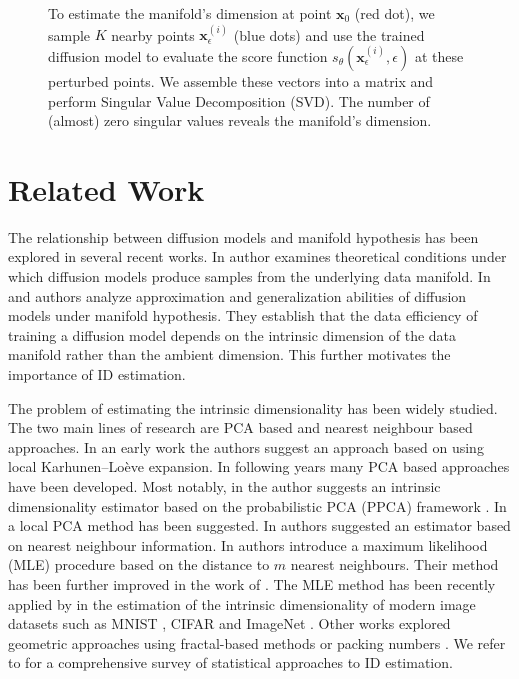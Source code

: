 \begin{figure}[h]
\begin{minipage}[t]{0.49\linewidth}
        \caption{To estimate the manifold's dimension at point \(\mathbf{x}_0\) (red dot), we sample \(K\) nearby points \(\mathbf{x}_{\epsilon}^{(i)}\) (blue dots) and use the trained diffusion model to evaluate the score function \(s_\theta(\mathbf{x}_\epsilon^{(i)}, \epsilon)\) at these perturbed points. We assemble these vectors into a matrix and perform Singular Value Decomposition (SVD). The number of (almost) zero singular values reveals the manifold's dimension.}
        \label{ch3:fig:zoom}
    \end{minipage}
\end{figure}


\section{Related Work}
\label{ch3:sec:related_work}
The relationship between diffusion models and manifold hypothesis has been explored in several recent works. In \cite{pidstrigach2022manifold_jakiw} author examines theoretical conditions under which diffusion models produce samples from the underlying data manifold. In \cite{oko2023diffusion_mini_max} and \cite{chen2023manifold_linear} authors analyze approximation and generalization abilities of diffusion models under manifold hypothesis. They establish that the data efficiency of training a diffusion model depends on the intrinsic dimension of the data manifold rather than the ambient dimension. This further motivates the importance of ID estimation.


The problem of estimating the intrinsic dimensionality has been widely studied. The two main lines of research are PCA based and nearest neighbour based approaches. In an early work \cite{Karhunen-Loeve} the authors suggest an approach based on using local Karhunen–Loève expansion. In following years many PCA based approaches have been developed. Most notably, in \cite{auto_ppca} the author suggests an intrinsic dimensionality estimator based on the probabilistic PCA (PPCA) framework \cite{ppca}. In \cite{fan_local_pca} a local PCA method has been suggested. In \cite{pettis_nn_dim_estimator} authors suggested an estimator based on nearest neighbour information.  In \cite{dim_MLE} authors introduce a maximum likelihood (MLE)  procedure based on the distance to $m$ nearest neighbours. Their method has been further improved in the work of \cite{haro_mle}. The MLE method has been recently applied by \cite{pope2021intrinsic} in the estimation of the intrinsic dimensionality of modern image datasets such as MNIST \cite{mnist}, CIFAR \cite{cifar} and ImageNet \cite{imagenet}. Other works explored geometric approaches using fractal-based methods \cite{fractal_dim} or packing numbers \cite{packing_number}. We refer to \cite{campadelli2015intrinsic} for a comprehensive survey of statistical approaches to ID estimation.

